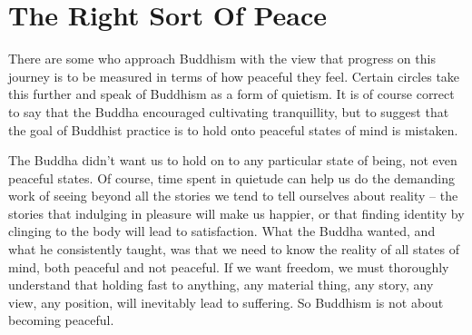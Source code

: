 
\chapter{The Right Sort Of Peace}


There are some who approach Buddhism with the view that progress on this
journey is to be measured in terms of how peaceful they feel. Certain
circles take this further and speak of Buddhism as a form of quietism.
It is of course correct to say that the Buddha encouraged cultivating
tranquillity, but to suggest that the goal of Buddhist practice is to
hold onto peaceful states of mind is mistaken.

The Buddha didn’t want us to hold on to any particular state of being,
not even peaceful states. Of course, time spent in quietude can help us
do the demanding work of seeing beyond all the stories we tend to tell
ourselves about reality – the stories that indulging in pleasure will
make us happier, or that finding identity by clinging to the body will
lead to satisfaction. What the Buddha wanted, and what he consistently
taught, was that we need to know the reality of all states of mind, both
peaceful and not peaceful. If we want freedom, we must thoroughly
understand that holding fast to anything, any material thing, any story,
any view, any position, will inevitably lead to suffering. So Buddhism
is not about becoming peaceful.

